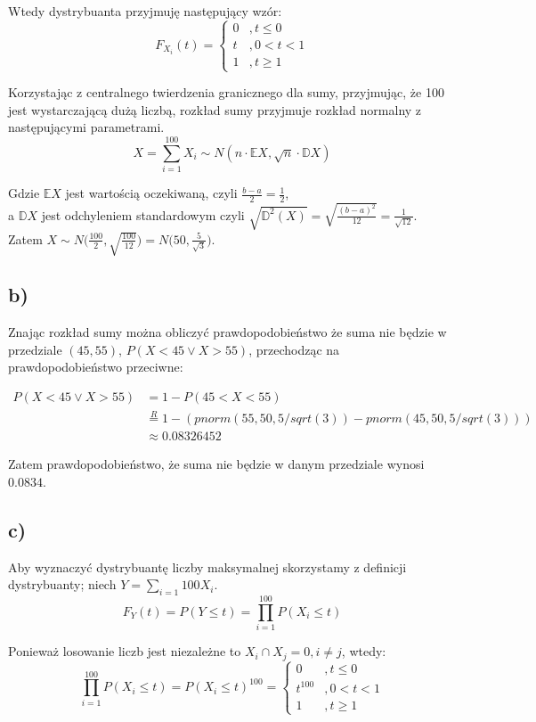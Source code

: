 \documentclass{article}
\begin{document}
{Wtedy dystrybuanta przyjmuję następujący wzór:
\[
F_{X_i}(t) = \left\{
\begin{array}{ll}
0 &, t \leq 0 \\
t &, 0 < t < 1 \\
1 &, t \geq 1
\end{array}
\right. 
\]

Korzystając z centralnego twierdzenia granicznego dla sumy, przyjmując, że 100 jest wystarczającą dużą liczbą, rozkład sumy przyjmuje rozkład normalny z następującymi parametrami.
\[
X = \sum_{i=1}^{100}X_i \sim N(n\cdot\mathbb{E}X, \sqrt{n}\cdot\mathbb{D}X)
\]

Gdzie $\mathbb{E}X$ jest wartością oczekiwaną, czyli $\frac{b-a}{2} = \frac{1}{2}$, \\
a $\mathbb{D}X$ jest odchyleniem standardowym czyli $\sqrt{\mathbb{D}^2(X)} = \sqrt{\frac{(b-a)^2}{12} }= \frac{1}{\sqrt{12}}$. \\
Zatem $X \sim N\big( \frac{100}{2}, \sqrt{\frac{100}{12}} \big) = N\big(50, \frac{5}{\sqrt{3}} \big)$.

\subsection{b)}
Znając rozkład sumy można obliczyć prawdopodobieństwo że suma nie będzie w przedziale $(45,55)$, $P(X<45 \vee X>55)$, przechodząc na prawdopodobieństwo przeciwne:

\begin{align*}
P(X<45 \vee X>55) & = 1 - P(45<X<55) \\
& \overset{R}{=} 1 - (pnorm(55,50,5/sqrt(3)) - pnorm(45, 50, 5/sqrt(3))) \\
& \approx 0.08326452
\end{align*}

Zatem prawdopodobieństwo, że suma nie będzie w danym przedziale wynosi $0.0834$.

\subsection{c)}
Aby wyznaczyć dystrybuantę liczby maksymalnej skorzystamy z definicji dystrybuanty; niech $Y = \sum_{i=1}{100}X_i$.
\[
F_Y(t) = P(Y\leq t) = \prod_{i=1}^{100}P(X_i \leq t)
\]

Ponieważ losowanie liczb jest niezależne to $X_i \cap X_j = 0, i \neq j$, wtedy:
\[
\prod_{i=1}^{100}P(X_i \leq t) = P(X_i \leq t)^{100} = 
 \left\{
\begin{array}{ll}
0 &, t \leq 0 \\
t^{100} &, 0 < t < 1 \\
1 &, t \geq 1
\end{array}
\right.
\]

}
\end{document}
